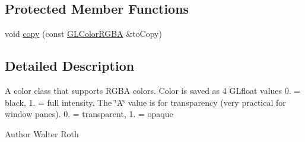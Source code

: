 \subsection*{\-Protected \-Member \-Functions}
\begin{DoxyCompactItemize}
\item 
void \hyperlink{classGLColorRGBA_a0b5cc5f5427905bfb3abd5011495d4a0}{copy} (const \hyperlink{classGLColorRGBA}{\-G\-L\-Color\-R\-G\-B\-A} \&to\-Copy)
\end{DoxyCompactItemize}


\subsection{\-Detailed \-Description}
\-A color class that supports \-R\-G\-B\-A colors. \-Color is saved as 4 \-G\-Lfloat values 0. = black, 1. = full intensity. \-The \char`\"{}\-A\char`\"{} value is for transparency (very practical for window panes). 0. = transparent, 1. = opaque \begin{DoxyAuthor}{\-Author}
\-Walter \-Roth 
\end{DoxyAuthor}


